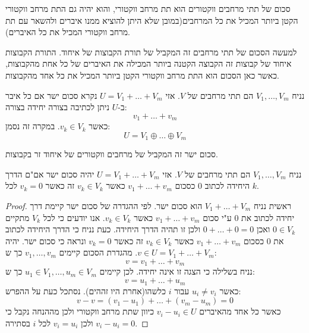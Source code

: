 \documentclass{tstextbook}
\begin{document}
\begin{proposition}
סכום של תתי מרחבים ווקטורים הוא תת מרחב ווקטורי, והוא יהיה גם התת מרחב ווקטורי הקטן ביותר המכיל את כל המרחבים(במובן שלא היתן להוציא ממנו איברים ולהשאר עם תת מרחב ווקטורי המכיל את כל האיברים).

\end{proposition}
\begin{remark}
למעשה הסכום של תתי מרחבים זה המקביל של תורת הקבוצות של איחוד. התורת הקבוצות איחוד של קבוצות זה הקבוצה הקטנה ביותר המכילה את האיברים של כל אחת מהקבוצות, כאשר כאן הסכום הוא התת מרחב ווקטורי הקטן ביותר המכיל את כל אחד מהקבוצות.

\end{remark}
\begin{definition}
נניח \(V_{1},\dots, V_{m}\) הם תתי מרחבים של \(V\). אזי \(U=V_{1}+\dots+V_{m}\) נקרא סכום ישר אם כל איבר ב-\(U\) ניתן לכתיבה בצורה יחידה בצורה:
$$v_{1}+\dots+v_{m}$$
כאשר \(v_{k}\in V_{k}\). במקרה זה נסמן:
$$U=V_{1}\oplus\dots \oplus V_{m}$$

\end{definition}
\begin{remark}
סכום ישר זה המקביל של מרחבים ווקטורים של איחוד זר בקבוצות.

\end{remark}
\begin{proposition}
נניח \(V_{1},\dots, V_{m}\) הם תתי מרחבים של \(V\). אזי \(U=V_{1}+\dots+V_{m}\) יהיה סכום ישר אם"ם הדרך היחידה לכתוב 0 כסכום \(v_{1}+\dots+v_{m}\) כאשר \(v_{k}\in V_{k}\) זה כאשר \(v_{k}=0\) לכל \(k\).

\end{proposition}
\begin{proof}
ראשית נניח \(V_{1}+\dots+V_{m}\) הוא סכום ישר. לפי ההגדרה של סכום ישר קיימת דרך יחידה לכתוב את 0 ע"י סכום \(v_{1}+\dots+v_{m}\) כאשר \(v_{k}\in V_{k}\). אנו יודעים כי לכל \(V_{k}\) מתקיים \(0 \in V_{k}\) ואכן \(0+\dots+0=0\) ולכן זו תהיה הדרך היחידה.
כעת נניח כי הדרך היחידה לכתוב את 0 כסכום \(v_{1}+\dots+v_{m}\) כאשר \(v_{k}\in V_{k}\)  זה כאשר \(v_{k}=0\) ונראה כי סכום ישר. יהיה \(v \in U=V_{1}+\dots+V_{m}\). מהגדרת הסכום קיימים \(v_{1},\dots,v_{m}\) כך ש:
$$v=v_{1}+\dots+v_{m}$$
נניח בשלילה כי הצגה זו אינה יחידה. לכן קיימים \(u_{1}\in V_{1},\dots,u_{m}\in V_{m}\) כך ש:
$$v=u_{1}+\dots+u_{m}$$
כאשר \(u_{i}\neq v_{i}\) עבור \(i\) כלשהו(אחרת היו זההים). נסתכל כעת על ההפרש:
$$v-v=(v_{1}-u_{1})+\dots+(v_{m}-u_{m})=0$$
כאשר כל אחד מהאיברים \(v_{i}-u_{i} \in U\) כיוון שתת מרחב ווקטורי ולכן מההנחה נקבל כי \(v_{i}-u_{i}=0\) ולכן \(v_{i}=u_{i}\) לכל \(i\) בסתירה.

\end{proof}
\end{document}
